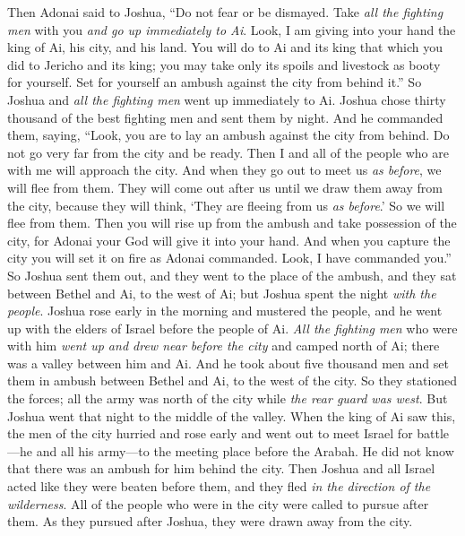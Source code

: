 \begin{biblechapter} %
 Then Adonai said to Joshua, “Do not fear or be dismayed. Take \textit{all the fighting men} with you \textit{and go up immediately to Ai}. Look, I am giving into your hand the king of Ai, his city, and his land.
\verse You will do to Ai and its king that which you did to Jericho and its king; you may take only its spoils and livestock as booty for yourself. Set for yourself an ambush against the city from behind it.”
\verse So Joshua and \textit{all the fighting men} went up immediately to Ai. Joshua chose thirty thousand of the best fighting men and sent them by night.
\verse And he commanded them, saying, “Look, you are to lay an ambush against the city from behind. Do not go very far from the city and be ready.
\verse Then I and all of the people who are with me will approach the city. And when they go out to meet us \textit{as before}, we will flee from them.
\verse They will come out after us until we draw them away from the city, because they will think, ‘They are fleeing from us \textit{as before}.’ So we will flee from them.
\verse Then you will rise up from the ambush and take possession of the city, for Adonai your God will give it into your hand.
\verse And when you capture the city you will set it on fire as Adonai commanded. Look, I have commanded you.”
\verse So Joshua sent them out, and they went to the place of the ambush, and they sat between Bethel and Ai, to the west of Ai; but Joshua spent the night \textit{with the people}.
\verse Joshua rose early in the morning and mustered the people, and he went up with the elders of Israel before the people of Ai.
\verse \textit{All the fighting men} who were with him \textit{went up and drew near before the city} and camped north of Ai; there was a valley between him and Ai.
\verse And he took about five thousand men and set them in ambush between Bethel and Ai, to the west of the city.
\verse So they stationed the forces; all the army was north of the city while \textit{the rear guard was west}. But Joshua went that night to the middle of the valley.
\verse When the king of Ai saw this, the men of the city hurried and rose early and went out to meet Israel for battle—he and all his army—to the meeting place before the Arabah. He did not know that there was an ambush for him behind the city.
\verse Then Joshua and all Israel acted like they were beaten before them, and they fled \textit{in the direction of the wilderness}.
\verse All of the people who were in the city were called to pursue after them. As they pursued after Joshua, they were drawn away from the city.

\end{biblechapter}
